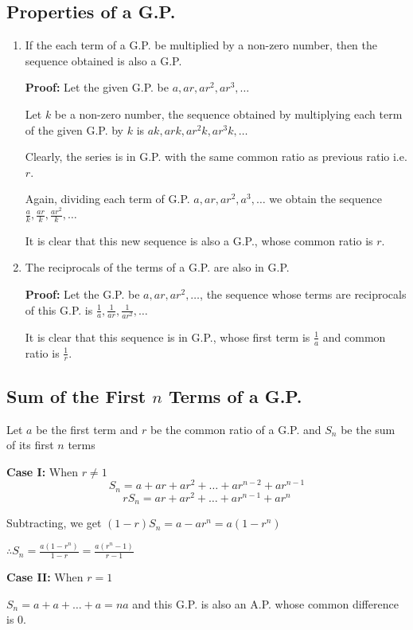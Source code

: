 \subsection{Properties of a G.P.}
\begin{enumerate}
\item If the each term of a G.P. be multiplied by a non-zero number, then the sequence obtained is also a G.P.

  \textbf{Proof:} Let the given G.P. be $a, ar, ar^2, ar^3, \ldots$

  Let $k$ be a non-zero number, the sequence obtained by multiplying each term of the given G.P. by $k$ is $ak, ark, ar^2k, ar^3k,
  \ldots$

  Clearly, the series is in G.P. with the same common ratio as previous ratio i.e. $r$.

  Again, dividing each term of G.P. $a, ar, ar^2, a^3, \ldots$ we obtain the sequence $\frac{a}{k}, \frac{ar}{k}, \frac{ar^2}{k},
  \ldots$

  It is clear that this new sequence is also a G.P., whose common ratio is $r$.
\item The reciprocals of the terms of a G.P. are also in G.P.

  \textbf{Proof:} Let the G.P. be $a, ar, ar^2, \ldots$, the sequence whose terms are reciprocals of this G.P. is $\frac{1}{a},
  \frac{1}{ar}, \frac{1}{ar^2}, \ldots$

  It is clear that this sequence is in G.P., whose first term is $\frac{1}{a}$ and common ratio is $\frac{1}{r}$.
\end{enumerate}

\subsection{Sum of the First $n$ Terms of a G.P.}
Let $a$ be the first term and $r$ be the common ratio of a G.P. and $S_n$ be the sum of its first $n$ terms

\textbf{Case I:} When $r\neq 1$
$$S_n = a + ar + ar^2 + \ldots + ar^{n - 2} + ar^{n - 1}$$
$$rS_n = ar + ar^2 + \ldots + ar^{n - 1} + ar^n$$

Subtracting, we get $(1 - r)S_n = a - ar^n = a(1 - r^n)$

$\therefore S_n = \frac{a(1 - r^n)}{1 - r} = \frac{a(r^n - 1)}{r - 1}$

\textbf{Case II:} When $r = 1$

$S_n = a + a + \ldots + a = na$ and this G.P. is also an A.P. whose common difference is $0$.

